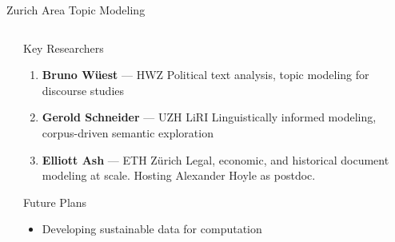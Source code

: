 \documentclass[compress]{beamer}
\begin{document}
\begin{frame}{Zurich Area Topic Modeling}
\begin{columns}
  \begin{column}{0.45\textwidth}
  \end{column}
  \begin{column}{0.5\textwidth}
    \begin{block}{Key Researchers}
      \begin{enumerate}
        \item \textbf{Bruno Wüest} — HWZ  
        Political text analysis, topic modeling for discourse studies

        \item \textbf{Gerold Schneider} — UZH LiRI  
        Linguistically informed modeling, corpus-driven semantic exploration

        \item \textbf{Elliott Ash} — ETH Zürich  
        Legal, economic, and historical document modeling at scale.  Hosting Alexander Hoyle as postdoc.
      \end{enumerate}
    \end{block}

    \begin{block}{Future Plans}
      \begin{itemize}
        \item Developing sustainable data for computation
      \end{itemize}
    \end{block}
  \end{column}
\end{columns}
\end{frame}
\end{document}
